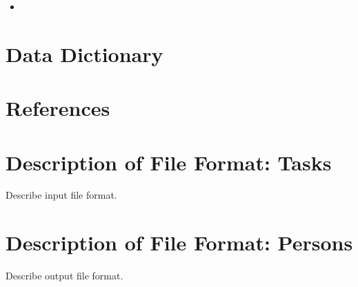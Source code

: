 \documentclass[11pt]{article}
\begin{document}
\begin{itemize}
    \item 
\end{itemize}

\section{Data Dictionary}

\section{References}

\appendix

\section{Description of File Format: Tasks}

Describe input file format.

\section{Description of File Format: Persons}

Describe output file format.
\end{document}
